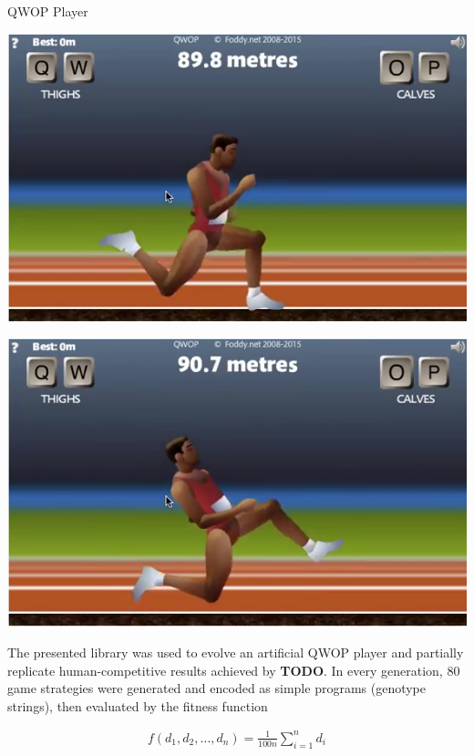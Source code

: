 \documentclass[a0paper,portrait]{baposter}
\newcommand*{\todo}{\textbf{TODO}}
\begin{document}
\begin{poster}
\begin{posterbox}[name=qwop,column=2]{QWOP Player}
	\vspace{0.5em}

	\parbox[c]{0.49\linewidth}{\includegraphics[width=\linewidth]{runner1}}
	\hfill
	\parbox[c]{0.49\linewidth}{\includegraphics[width=\linewidth]{runner2}}

	\vspace{0.5em}

	The presented library was used to evolve an artificial QWOP player and partially replicate human-competitive results achieved by \todo. In every generation, 80 game strategies were generated and encoded as simple programs (genotype strings), then evaluated by the fitness function

	\vspace{-1.7em}

	\begin{align*}
		f(d_1,d_2,\dots,d_n) = \frac{1}{100n} \sum_{i=1}^n d_i
	\end{align*}


\end{posterbox}
\end{poster}
\end{document}
